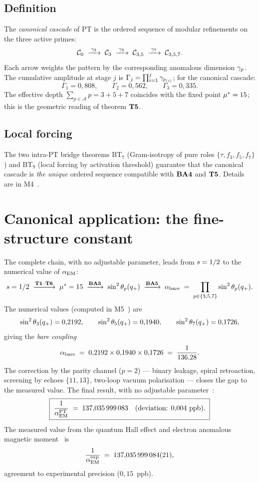 \subsection{Definition}

The \emph{canonical cascade} of PT is the ordered sequence of modular refinements on the three active primes:
\[
\mathcal C_0 \;\xrightarrow{\;\gamma_{3}\;}\; \mathcal C_3
\;\xrightarrow{\;\gamma_{5}\;}\; \mathcal C_{3,5}
\;\xrightarrow{\;\gamma_{7}\;}\; \mathcal C_{3,5,7}.
\]
Each arrow weights the pattern by the corresponding anomalous dimension $\gamma_{p}$. The cumulative amplitude at stage $j$ is $\Gamma_j = \prod_{i=1}^{j} \gamma_{p_{(i)}}$; for the canonical cascade:
\[
\Gamma_1 = 0{,}808, \qquad
\Gamma_2 = 0{,}562, \qquad
\Gamma_3 = 0{,}335.
\]
The effective depth $\sum_{p \in \mathcal A} p = 3 + 5 + 7$ coincides with the fixed point $\mu^{*} = 15$; this is the geometric reading of theorem $\textbf{T5}$.

\subsection{Local forcing}

The two intra-PT bridge theorems $\mathrm{BT}_7$ (Gram-isotropy of pure roles $\{\tau, f_3, f_5, f_7\}$) and $\mathrm{BT}_9$ (local forcing by activation threshold) guarantee that the canonical cascade is \emph{the unique} ordered sequence compatible with $\textbf{BA4}$ and $\textbf{T5}$. Details are in M4~\cite{companion_M4}.

\section{Canonical application: the fine-structure constant}
\label{sec:alphaem}

The complete chain, with no adjustable parameter, leads from $s = 1/2$ to the numerical value of $\alpha_{\rm EM}$:
\[
s = 1/2 \;\xrightarrow{\textbf{T1}\text{--}\textbf{T6}}\; \mu^{*} = 15
\;\xrightarrow{\textbf{BA3}}\; \sin^{2}\theta_{p}(q_{+})
\;\xrightarrow{\textbf{BA5}}\; \alpha_{\rm bare} \;=\; \prod_{p\in\{3,5,7\}}\sin^{2}\theta_{p}(q_{+}).
\]
The numerical values (computed in M5~\cite{companion_M5}) are
\[
\sin^{2}\theta_{3}(q_{+}) = 0{,}2192, \qquad
\sin^{2}\theta_{5}(q_{+}) = 0{,}1940, \qquad
\sin^{2}\theta_{7}(q_{+}) = 0{,}1726,
\]
giving the \emph{bare coupling}
\[
\alpha_{\rm bare} \;=\; 0{,}2192 \times 0{,}1940 \times 0{,}1726
\;=\; \dfrac{1}{136{,}28}.
\]
The correction by the parity channel ($p = 2$) --- binary leakage, spiral retroaction, screening by echoes $\{11, 13\}$, two-loop vacuum polarisation --- closes the gap to the measured value. The final result, with no adjustable parameter~\cite{companion_M5}:
\[
\boxed{\;\dfrac{1}{\alpha_{\rm EM}^{\rm PT}} \;=\; 137{,}035\,999\,083 \quad\text{(deviation: $0{,}004$~ppb).}\;}
\]
The measured value from the quantum Hall effect and electron anomalous magnetic moment~\cite{PDG2024} is
\[
\dfrac{1}{\alpha_{\rm EM}^{\rm exp}} \;=\; 137{,}035\,999\,084(21),
\]
agreement to experimental precision ($0{,}15$~ppb).

